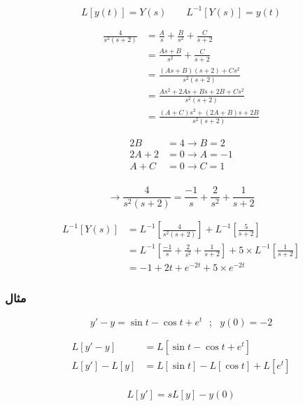 \documentclass[12pt]{book}
\begin{document}
\begin{tcolorbox}
$$
L[y(t)] = Y(s) \qquad L^{-1}[Y(s)] = y(t)
$$
\end{tcolorbox}


\begin{align*}
\frac{4}{s^{2}(s+2)} &= \frac{A}{s} + \frac{B}{s^{2}} + \frac{C}{s+2} \\
&= \frac{As + B}{s^{2}} + \frac{C}{s+2} \\
&= \frac{(As+B)(s+2) + Cs^{2}}{s^{2}(s+2)} \\
&= \frac{As^{2} + 2As + Bs + 2B + Cs^{2}}{s^{2}(s+2)} \\
&= \frac{(A+C)s^{2} + (2A+B)s + 2B}{s^{2}(s+2)}
\end{align*}


\begin{align*}
2B &= 4 \to B = 2 \\
2A + 2 &= 0 \to A = -1 \\
A + C &= 0 \to C = 1 \\
\end{align*}

$$
\to \frac{4}{s^{2}(s+2)} = \frac{-1}{s} + \frac{2}{s^{2}} + \frac{1}{s+2}
$$



\begin{align*}
L^{-1}[Y(s)] &= L^{-1}\left[ \frac{4}{s^{2}(s+2)} \right] + L^{-1}\left[ \frac{5}{s+2} \right] \\
&= L^{-1}\left[ \frac{-1}{s} + \frac{2}{s^{2}} + \frac{1}{s+2} \right] + 5 \times L^{-1}\left[ \frac{1}{s+2} \right] \\
&= -1 + 2t + e^{-2t} + 5 \times e^{-2t} 
\end{align*}



\subsubsection{مثال}

$$
y' - y = \sin{t} - \cos{t} + e^{t} \:\:\: ; \:\:\: y(0) = -2
$$



\begin{align*}
L[y' - y] &= L[\sin{t} - \cos{t} + e^{t}] \\
L[y'] - L[y] &= L[\sin{t}] - L[\cos{t}] + L[e^{t}] \\
\end{align*}


\begin{tcolorbox}
$$
L[y'] = sL[y] - y(0)
$$
\end{tcolorbox}
\end{document}
